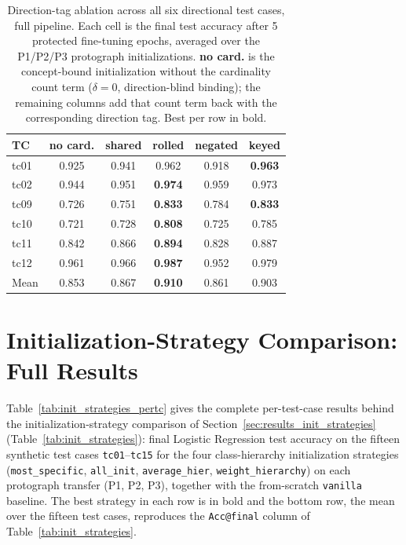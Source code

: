 \documentclass[a4paper,oneside,bibliography=totoc]{scrbook}
\begin{document}
\begin{table}[ht]
\centering
\small
\caption{Direction-tag ablation across all six directional test cases, full
pipeline. Each cell is the final test accuracy after 5 protected fine-tuning
epochs, averaged over the P1/P2/P3 protograph initializations. \textbf{no card.}
is the concept-bound initialization without the cardinality count term
($\delta{=}0$, direction-blind binding); the remaining columns add that count
term back with the corresponding direction tag. Best per row in bold.}
\label{tab:direction_all}
\begin{tabular}{lccccc}
\toprule
\textbf{TC} & \textbf{no card.} & \textbf{shared} & \textbf{rolled} & \textbf{negated} & \textbf{keyed} \\
\midrule
tc01 & 0.925 & 0.941 & 0.962 & 0.918 & \textbf{0.963} \\
tc02 & 0.944 & 0.951 & \textbf{0.974} & 0.959 & 0.973 \\
tc09 & 0.726 & 0.751 & \textbf{0.833} & 0.784 & \textbf{0.833} \\
tc10 & 0.721 & 0.728 & \textbf{0.808} & 0.725 & 0.785 \\
tc11 & 0.842 & 0.866 & \textbf{0.894} & 0.828 & 0.887 \\
tc12 & 0.961 & 0.966 & \textbf{0.987} & 0.952 & 0.979 \\
\midrule
Mean & 0.853 & 0.867 & \textbf{0.910} & 0.861 & 0.903 \\
\bottomrule
\end{tabular}
\end{table}

\section{Initialization-Strategy Comparison: Full Results}
\label{app:init-strategies}

Table~\ref{tab:init_strategies_pertc} gives the complete per-test-case results
behind the initialization-strategy comparison of
Section~\ref{sec:results_init_strategies} (Table~\ref{tab:init_strategies}):
final Logistic Regression test accuracy on the fifteen synthetic test cases
\texttt{tc01}--\texttt{tc15} for the four class-hierarchy initialization
strategies (\texttt{most\_specific}, \texttt{all\_init}, \texttt{average\_hier},
\texttt{weight\_hierarchy}) on each protograph transfer (P1, P2, P3), together
with the from-scratch \texttt{vanilla} baseline. The best strategy in each row is
in bold and the bottom row, the mean over the fifteen test cases, reproduces the
\texttt{Acc@final} column of Table~\ref{tab:init_strategies}.
\end{document}

